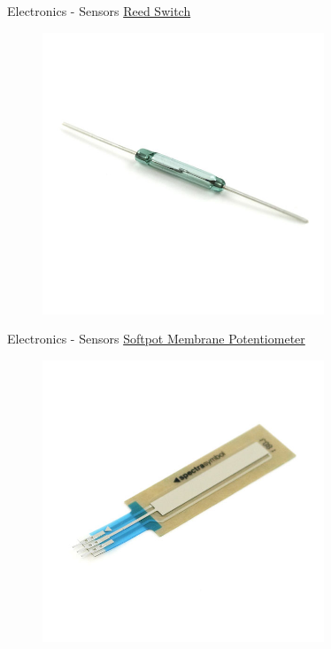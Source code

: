 \documentclass{beamer}
\begin{document}
\begin{frame}{Electronics - Sensors}
    \href{https://www.sparkfun.com/products/8642}{Reed Switch}
    \begin{figure}[h]
        \includegraphics[width=0.75\textwidth]{reed.jpg}
    \end{figure}
\end{frame}

\begin{frame}{Electronics - Sensors}
    \href{https://www.sparkfun.com/products/8680}{Softpot Membrane Potentiometer}
    \begin{figure}[h]
        \includegraphics[width=0.75\textwidth]{softpot.jpg}
    \end{figure}
\end{frame}
\end{document}

